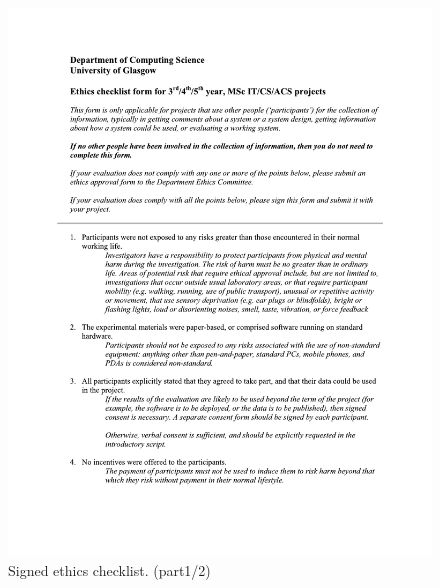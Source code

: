 \documentclass{l4proj}
\begin{document}
\begin{appendices}
\begin{figure}
    \includegraphics[page=1,width=\linewidth]{Appendices/ethics_form_KM.pdf}
    \caption{Signed ethics checklist. (part1/2)}
    \label{fig:ethics1}
\end{figure}


\end{appendices}
\end{document}
